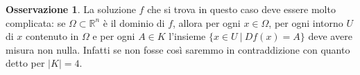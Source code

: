 \documentclass[a4paper,11pt]{book}
\theoremstyle{plain}
\newtheorem{teo}{Teorema}[chapter]
\theoremstyle{definition}
\newtheorem{oss}[defn]{Osservazione}
\theoremstyle{remark}
\newcommand{\R}{\mathbb{R}}
\DeclareMathOperator{\rk}{rk}
\begin{document}
\begin{oss}
	La soluzione $f$ che si trova in questo caso deve essere molto complicata: se $\Omega\subset \R^{n}$ è il dominio di $f$, allora per ogni $x\in \Omega$, per ogni intorno $U$ di $x$ contenuto in $\Omega$ e per ogni $A\in K$ l'insieme $\{x\in U\ |\ Df(x)=A\}$ deve avere misura non nulla. Infatti se non fosse così saremmo in contraddizione con quanto detto per $|K|=4$.
\end{oss}
\begin{comment}

Vediamo ora come applicare i risultati appena dimostrati per risolvere il caso con quattro matrici:
\begin{teo}\label{teo:3}
	Sia $K=\{A_1,A_2,A_3,A_4\}$ con $\rk(A_i-A_j)\neq 1\ \forall i,j$. Dati $\Omega$ e $u$ come nel teorema \ref{teo:2}, se $Du\in K$ q.o. allora $Du$ è costante q.o.
\end{teo}


\end{comment}
\end{document}

